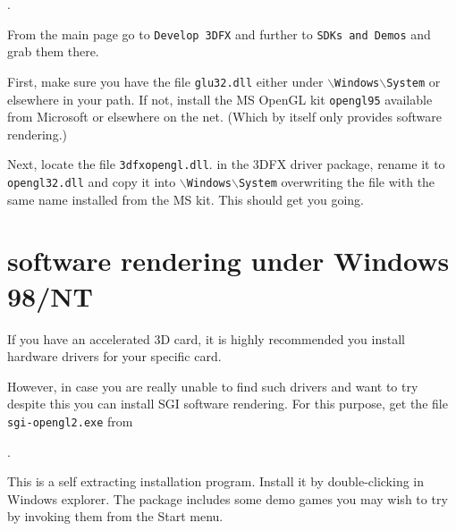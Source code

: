 .

\noindent
 From the main page go to \texttt{Develop 3DFX} and further to \texttt{SDKs and
Demos} and grab them there.

First, make sure you have the file \texttt{glu32.dll} either under
\texttt{$\backslash$Windows$\backslash$System} or elsewhere in your path. If not, install
the MS OpenGL kit \texttt{opengl95} available from Microsoft or elsewhere on the net.
(Which by itself only provides software rendering.)

Next, locate the file \texttt{3dfxopengl.dll}. in the 3DFX driver package, rename it to
\texttt{opengl32.dll} and copy it into \texttt{$\backslash$Windows$\backslash$System}
overwriting the file with the same name installed from the MS kit. This should get you
going.

\section{ software rendering
under Windows 98/NT\label{softrend}}

If you have an accelerated 3D card, it is highly recommended you
install hardware  drivers for your specific card.

However, in case you are really unable to find such drivers and
want to try \FlightGear despite this you can install SGI software
 rendering. For this purpose, get the file
\texttt{sgi-opengl2.exe} from

.

 \noindent
This is a  self extracting installation
program. Install it by double-clicking in Windows explorer. The
package includes some demo games you may wish to try by invoking
them from the Start menu.

